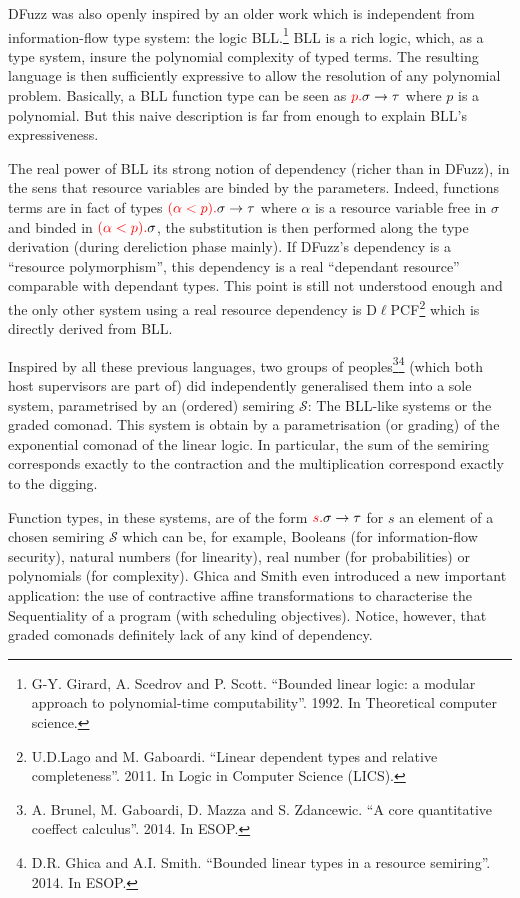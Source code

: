 \documentclass{article}[11pt]
\newcommand\sS{\mathcal S}
\begin{document}
DFuzz was also openly inspired by an older work which is independent from information-flow type system: the logic BLL.\footnote{G-Y. Girard, A. Scedrov and P. Scott. ``Bounded linear logic: a modular approach to polynomial-time computability''. 1992. In Theoretical computer science.} BLL is a rich logic, which, as a type system, insure the polynomial complexity of typed terms. The resulting language is then sufficiently expressive to allow the resolution of any polynomial problem. Basically, a BLL function type can be seen as  ${\color{red}p.}\sigma\rightarrow \tau$ where $p$ is a polynomial. But this naive description is far from enough to explain BLL's expressiveness.

The real power of BLL its strong notion of dependency (richer than in DFuzz), in the sens that resource variables are binded by the parameters. Indeed, functions terms are in fact of types ${\color{red}(\alpha<p).}\sigma\rightarrow \tau$ where $\alpha$ is a resource variable free in $\sigma$ and binded in ${\color{red}(\alpha<p).}\sigma$, the substitution is then performed along the type derivation (during dereliction phase mainly). If DFuzz's dependency is a ``resource polymorphism'', this dependency is a real ``dependant resource'' comparable with dependant types. This point is still not understood enough and the only other system using a real resource dependency is D$\ell$PCF\footnote{U.D.Lago and M. Gaboardi. ``Linear dependent types and relative completeness''. 2011. In Logic in Computer Science (LICS).} which is directly derived from BLL.

Inspired by all these previous languages, two groups of peoples\footnote{A. Brunel, M. Gaboardi, D. Mazza and S. Zdancewic. ``A core quantitative coeffect calculus''. 2014. In ESOP.}\footnote{D.R. Ghica and A.I. Smith. ``Bounded linear types in a resource semiring''. 2014. In ESOP.} (which both host supervisors are part of) did independently generalised them into a sole system, parametrised by an (ordered) semiring $\sS$: The BLL-like systems or the graded comonad.  This system is obtain by a parametrisation (or grading) of the exponential comonad of the linear logic. In particular, the sum of the semiring corresponds exactly to the contraction and the multiplication correspond exactly to the digging. 

Function types, in these systems, are of the form ${\color{red}s.}\sigma\rightarrow \tau$ for $s$ an element of a chosen semiring $\sS$ which can be, for example, Booleans (for information-flow security), natural numbers (for linearity), real number (for probabilities) or polynomials (for complexity). Ghica and Smith even introduced a new important application: the use of contractive affine transformations to characterise the Sequentiality of a program (with scheduling objectives). Notice, however, that graded comonads definitely lack of any kind of dependency.
\end{document}
